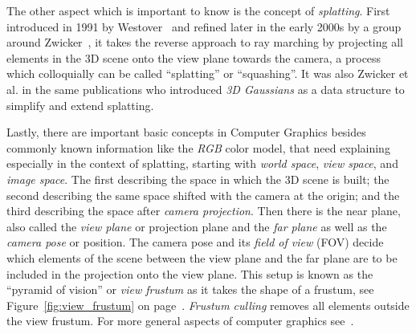 The other aspect which is important to know is the concept of \textit{splatting}. First introduced in 1991 by Westover~\cite{Westover1991SplattingAP} and refined later in the early 2000s by a group around Zwicker~\cite{zwickerEWAVolumeSplatting2001, zwickerSurfaceSplatting2001}, it takes the reverse approach to ray marching by projecting all elements in the 3D scene onto the view plane towards the camera, a process which colloquially can be called ``splatting'' or ``squashing''. 
It was also Zwicker et al. in the same publications who introduced \textit{3D Gaussians} as a data structure to simplify and extend splatting.

Lastly, there are important basic concepts in Computer Graphics besides commonly known information like the \textit{RGB} color model, that need explaining especially in the context of splatting, starting with \textit{world space}, \textit{view space}, and \textit{image space}. The first describing the space in which the 3D scene is built; the second describing the same space shifted with the camera at the origin; and the third describing the space after \textit{camera projection}.
Then there is the near plane, also called the \textit{view plane} or projection plane and the \textit{far plane} as well as the \textit{camera pose} or position. The camera pose and its \textit{field of view} (FOV) decide which elements of the scene between the view plane and the far plane are to be included in the projection onto the view plane.
This setup is known as the ``pyramid of vision'' or \textit{view frustum} as it takes the shape of a frustum, see Figure~\ref{fig:view_frustum} on page~\pageref{fig:view_frustum}. \textit{Frustum culling} removes all elements outside the view frustum. For more general aspects of computer graphics see~\cite{marschnerFundamentalsComputerGraphics2021}.